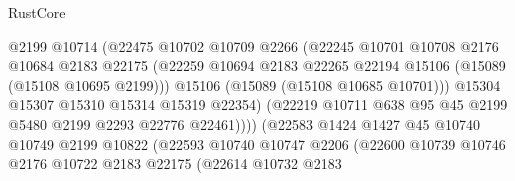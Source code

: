 \begin{lexlean}{RustCore}
\begin{coremodule}
                                  @2199
                                  @10714
                                  (@22475
                                    @10702
                                    @10709
                                    @2266
                                    (@22245
                                      @10701
                                      @10708
                                      @2176
                                      @10684
                                      @2183
                                      @22175
                                      (@22259
                                        @10694
                                        @2183
                                        @22265
                                        @22194
                                        @15106
                                        (@15089 (@15108 @10695 @2199)))
                                      @15106
                                      (@15089 (@15108 @10685 @10701)))
                                    @15304
                                    @15307
                                    @15310
                                    @15314
                                    @15319
                                    @22354)
                                  (@22219
                                    @10711
                                    @638
                                    @95
                                    @45
                                    @2199
                                    @5480
                                    @2199
                                    @2293
                                    @22776
                                    @22461))))
                            (@22583
                              @1424
                              @1427
                              @45
                              @10740
                              @10749
                              @2199
                              @10822
                              (@22593
                                @10740
                                @10747
                                @2206
                                (@22600
                                  @10739
                                  @10746
                                  @2176
                                  @10722
                                  @2183
                                  @22175
                                  (@22614
                                    @10732
                                    @2183

\end{coremodule}
\end{lexlean}
